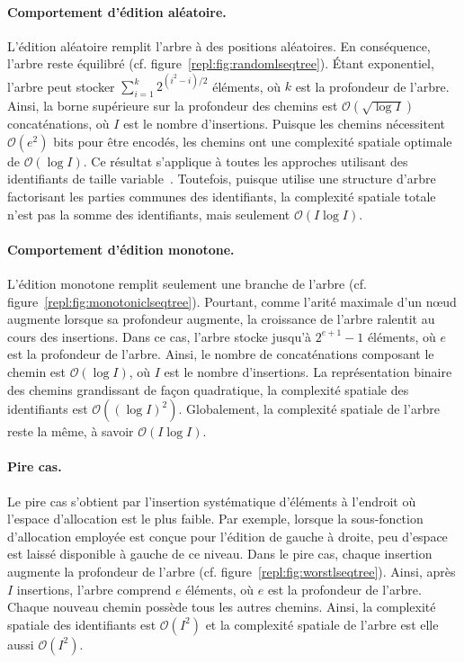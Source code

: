 \paragraph{Comportement d'édition aléatoire. } L'édition aléatoire remplit
l'arbre à des positions aléatoires. En conséquence, l'arbre reste équilibré
(cf. figure~\ref{repl:fig:randomlseqtree}). Étant exponentiel, l'arbre peut
stocker $\textstyle\sum\nolimits_{i=1}^{k}{2^{(i^2-i)/2}}$ éléments, où $k$ est
la profondeur de l'arbre. Ainsi, la borne supérieure sur la profondeur des
chemins est $\mathcal{O}(\sqrt{\log I})$ concaténations, où $I$ est le nombre
d'insertions. Puisque les chemins nécessitent $\mathcal{O}(e^2)$ bits pour être
encodés, les chemins ont une complexité spatiale optimale de
$\mathcal{O}(\log I)$. Ce résultat s'applique à toutes les approches utilisant
des identifiants de taille variable~\cite{preguica2009commutative,
  weiss2009logoot}. Toutefois, puisque \LSEQ utilise une structure d'arbre
factorisant les parties communes des identifiants, la complexité spatiale totale
n'est pas la somme des identifiants, mais seulement $\mathcal{O}(I\log I)$.

\paragraph{Comportement d'édition monotone.} L'édition monotone remplit
seulement une branche de l'arbre
(cf. figure~\ref{repl:fig:monotoniclseqtree}). Pourtant, comme l'arité maximale
d'un nœud augmente lorsque sa profondeur augmente, la croissance de l'arbre
ralentit au cours des insertions. Dans ce cas, l'arbre stocke jusqu'à
$2^{e+1}-1$ éléments, où $e$ est la profondeur de l'arbre. Ainsi, le nombre de
concaténations composant le chemin est $\mathcal{O}(\log I)$, où $I$ est le
nombre d'insertions. La représentation binaire des chemins grandissant de façon
quadratique, la complexité spatiale des identifiants est
$\mathcal{O}((\log I)^2)$. Globalement, la complexité spatiale de l'arbre reste
la même, à savoir $\mathcal{O}(I \log I)$.

\paragraph{Pire cas.} Le pire cas s'obtient par l'insertion systématique
d'éléments à l'endroit où l'espace d'allocation est le plus faible. Par exemple,
lorsque la sous-fonction d'allocation employée est conçue pour l'édition de
gauche à droite, peu d'espace est laissé disponible à gauche de ce niveau.  Dans
le pire cas, chaque insertion augmente la profondeur de l'arbre
(cf. figure~\ref{repl:fig:worstlseqtree}). Ainsi, après $I$ insertions, l'arbre
comprend $e$ éléments, où $e$ est la profondeur de l'arbre. Chaque nouveau
chemin possède tous les autres chemins. Ainsi, la complexité spatiale des
identifiants est $\mathcal{O}(I^2)$ et la complexité spatiale de l'arbre est
elle aussi $\mathcal{O}(I^2)$.

